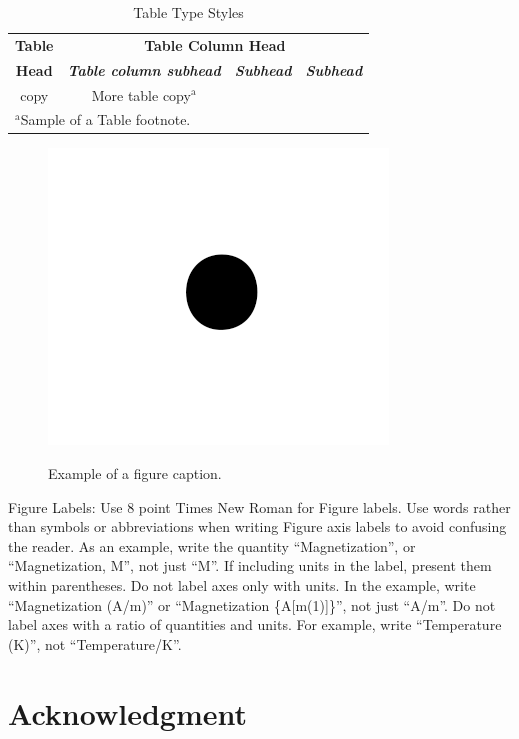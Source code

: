 \documentclass[conference]{IEEEtran}
\begin{document}
\begin{table}[htbp]
\caption{Table Type Styles}
\begin{center}
\begin{tabular}{|c|c|c|c|}
\hline
\textbf{Table}&\multicolumn{3}{|c|}{\textbf{Table Column Head}} \\
\cline{2-4} 
\textbf{Head} & \textbf{\textit{Table column subhead}}& \textbf{\textit{Subhead}}& \textbf{\textit{Subhead}} \\
\hline
copy& More table copy$^{\mathrm{a}}$& &  \\
\hline
\multicolumn{4}{l}{$^{\mathrm{a}}$Sample of a Table footnote.}
\end{tabular}
\label{tab1}
\end{center}
\end{table}

\begin{figure}[htbp]
{\includegraphics{fig1.png}}
\caption{Example of a figure caption.}
\label{fig}
\end{figure}

Figure Labels: Use 8 point Times New Roman for Figure labels. Use words 
rather than symbols or abbreviations when writing Figure axis labels to 
avoid confusing the reader. As an example, write the quantity 
``Magnetization'', or ``Magnetization, M'', not just ``M''. If including 
units in the label, present them within parentheses. Do not label axes only 
with units. In the example, write ``Magnetization (A/m)'' or ``Magnetization 
\{A[m(1)]\}'', not just ``A/m''. Do not label axes with a ratio of 
quantities and units. For example, write ``Temperature (K)'', not 
``Temperature/K''.

\section*{Acknowledgment}
\end{document}

